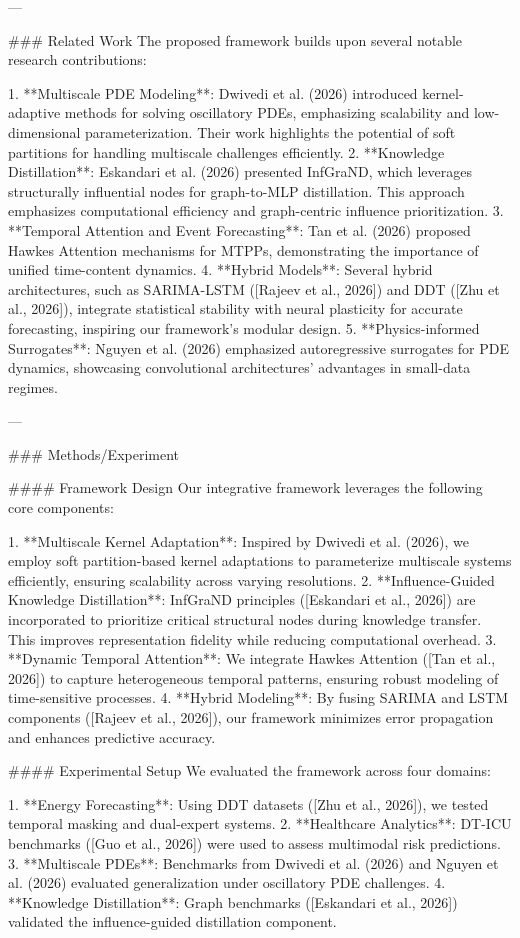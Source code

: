 ---

### Related Work  
The proposed framework builds upon several notable research contributions:

1. **Multiscale PDE Modeling**: Dwivedi et al. (2026) introduced kernel-adaptive methods for solving oscillatory PDEs, emphasizing scalability and low-dimensional parameterization. Their work highlights the potential of soft partitions for handling multiscale challenges efficiently.
2. **Knowledge Distillation**: Eskandari et al. (2026) presented InfGraND, which leverages structurally influential nodes for graph-to-MLP distillation. This approach emphasizes computational efficiency and graph-centric influence prioritization.
3. **Temporal Attention and Event Forecasting**: Tan et al. (2026) proposed Hawkes Attention mechanisms for MTPPs, demonstrating the importance of unified time-content dynamics.
4. **Hybrid Models**: Several hybrid architectures, such as SARIMA-LSTM ([Rajeev et al., 2026]) and DDT ([Zhu et al., 2026]), integrate statistical stability with neural plasticity for accurate forecasting, inspiring our framework's modular design.
5. **Physics-informed Surrogates**: Nguyen et al. (2026) emphasized autoregressive surrogates for PDE dynamics, showcasing convolutional architectures' advantages in small-data regimes.

---

### Methods/Experiment  

#### Framework Design  
Our integrative framework leverages the following core components:

1. **Multiscale Kernel Adaptation**: Inspired by Dwivedi et al. (2026), we employ soft partition-based kernel adaptations to parameterize multiscale systems efficiently, ensuring scalability across varying resolutions.
2. **Influence-Guided Knowledge Distillation**: InfGraND principles ([Eskandari et al., 2026]) are incorporated to prioritize critical structural nodes during knowledge transfer. This improves representation fidelity while reducing computational overhead.
3. **Dynamic Temporal Attention**: We integrate Hawkes Attention ([Tan et al., 2026]) to capture heterogeneous temporal patterns, ensuring robust modeling of time-sensitive processes.
4. **Hybrid Modeling**: By fusing SARIMA and LSTM components ([Rajeev et al., 2026]), our framework minimizes error propagation and enhances predictive accuracy.

#### Experimental Setup  
We evaluated the framework across four domains:

1. **Energy Forecasting**: Using DDT datasets ([Zhu et al., 2026]), we tested temporal masking and dual-expert systems.
2. **Healthcare Analytics**: DT-ICU benchmarks ([Guo et al., 2026]) were used to assess multimodal risk predictions.
3. **Multiscale PDEs**: Benchmarks from Dwivedi et al. (2026) and Nguyen et al. (2026) evaluated generalization under oscillatory PDE challenges.
4. **Knowledge Distillation**: Graph benchmarks ([Eskandari et al., 2026]) validated the influence-guided distillation component.

